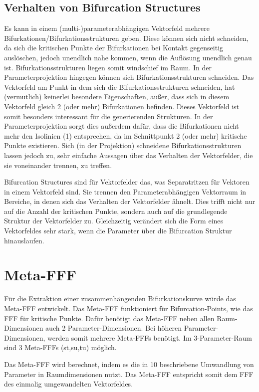 \documentclass[11pt]{article}
\begin{document}
\subsection{Verhalten von Bifurcation Structures}
Es kann in einem (multi-)parameterabhängigen Vektorfeld mehrere Bifurkationen/Bifurkationsstrukturen geben.
Diese können sich nicht schneiden, da sich die kritischen Punkte der Bifurkationen bei Kontakt gegenseitig auslöschen, jedoch unendlich nahe kommen, wenn die Auflösung unendlich genau ist. Bifurkationsstrukturen liegen somit windschief im Raum. 
In der Parameterprojektion hingegen können sich Bifurkationsstrukturen schneiden. Das Vektorfeld am Punkt in dem sich die Bifurkationsstrukturen schneiden, hat (vermutlich) keinerlei besondere Eigenschaften, außer, dass sich in diesem Vektorfeld gleich 2 (oder mehr) Bifurkationen befinden.
Dieses Vektorfeld ist somit besonders interessant für die generierenden Strukturen.
In der Parameterprojektion sorgt dies außerdem dafür, dass die Bifurkationen nicht mehr den Isolinien (1) entsprechen, da im Schnittpunkt 2 (oder mehr) kritische Punkte existieren.
Sich (in der Projektion) schneidene Bifurkationsstrukturen lassen jedoch zu, sehr einfache Aussagen über das Verhalten der Vektorfelder, die sie voneinander trennen, zu treffen.

Bifurcation Structures sind für Vektorfelder das, was Separatritzen für Vektoren in einem Vektorfeld sind. Sie trennen den Parameterabhängigen Vektorraum in Bereiche, in denen sich das Verhalten der Vektorfelder ähnelt. Dies trifft nicht nur auf die Anzahl der kritischen Punkte, sondern auch auf die grundlegende Struktur der Vektorfelder zu. Gleichzeitig verändert sich die Form eines Vektorfeldes sehr stark, wenn die Parameter über die Bifurcation Struktur hinauslaufen.

\section{Meta-FFF}
Für die Extraktion einer zusammenhängenden Bifurkationskurve würde das Meta-FFF entwickelt. 
Das Meta-FFF funktioniert für Bifurcation-Points, wie das FFF für kritische Punkte.
Dafür benötigt das Meta-FFF neben allen Raum-Dimensionen auch 2 Parameter-Dimensionen.
Bei höheren Parameter-Dimensionen, werden somit mehrere Meta-FFFs benötigt.
Im 3-Parameter-Raum sind 3 Meta-FFFs (st,su,tu) möglich.

Das Meta-FFF wird berechnet, indem es die in 10 beschriebene Umwandlung von Parameter in Raumdimensionen nutzt.
Das Meta-FFF entspricht somit dem FFF des einmalig umgewandelten Vektorfeldes.
\end{document}
